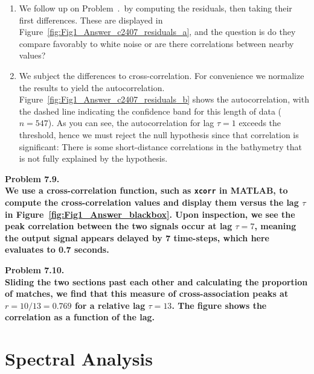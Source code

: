 \begin{enumerate}[label=\alph*)]
\item We follow up on Problem~\theConradchap.\theConrad\ by computing the residuals, then taking their first differences.
These are displayed in Figure~\ref{fig:Fig1_Answer_c2407_residuals_a}, and the question is do they compare favorably to white noise
or are there correlations between nearby values?
\item We subject the differences to cross-correlation.  For convenience we normalize the results to yield the autocorrelation.
Figure~\ref{fig:Fig1_Answer_c2407_residuals_b} shows the autocorrelation, with the dashed line indicating the confidence band for
this length of data ($n = 547$).  As you can see, the autocorrelation for lag $\tau = 1$ exceeds the threshold,
hence we must reject the null hypothesis since that correlation is significant: There is some short-distance correlations in the
bathymetry that is not fully explained by the hypothesis.
\end{enumerate}

\noindent
\bf{Problem 7.9.} \\

We use a cross-correlation function, such as \texttt{xcorr} in MATLAB, to compute the cross-correlation values and display
them versus the lag $\tau$ in Figure~\ref{fig:Fig1_Answer_blackbox}.  Upon inspection, we see the peak correlation between
the two signals occur at lag $\tau = 7$, meaning the output signal appears delayed by 7 time-steps, which here evaluates to 0.7 seconds.


\noindent
\bf{Problem 7.10.} \\

Sliding the two sections past each other and calculating the proportion of matches, we find that
this measure of cross-association peaks at $r = 10/13 = 0.769$ for a relative lag $\tau = 13$.
The figure shows the correlation as a function of the lag.

\section{Spectral Analysis}

